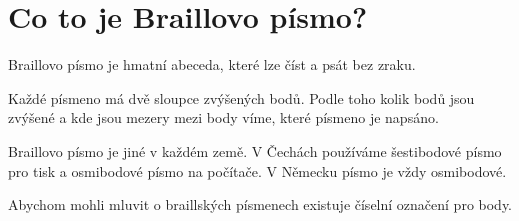 \section{Co to je Braillovo písmo?}

Braillovo písmo je hmatní abeceda, které lze číst a psát bez zraku.

Každé písmeno má dvě sloupce zvýšených bodů. Podle toho kolik bodů jsou zvýšené a kde jsou mezery mezi body víme, které písmeno je napsáno.

Braillovo písmo je jiné v každém země.  V Čechách používáme šestibodové písmo pro tisk a osmibodové písmo na počítače.  V Německu písmo je vždy osmibodové.

Abychom mohli mluvit o braillských písmenech existuje číselní označení pro body.


\begin{table}[!hb]
\centering
{}
\end{table}
